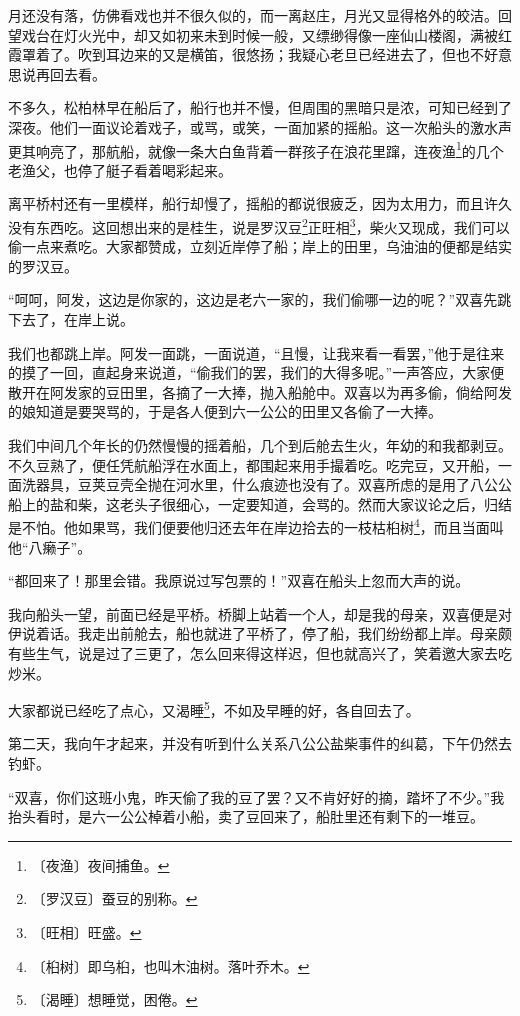 \documentclass[12pt,UTF-8,openany]{ctexbook}
\begin{document}
\begin{normalsize}
    月还没有落，仿佛看戏也并不很久似的，而一离赵庄，月光又显得格外的皎洁。回望戏台在灯火光中，却又如初来未到时候一般，又缥缈得像一座仙山楼阁，满被红霞罩着了。吹到耳边来的又是横笛，很悠扬；我疑心老旦已经进去了，但也不好意思说再回去看。
    
    不多久，松柏林早在船后了，船行也并不慢，但周围的黑暗只是浓，可知已经到了深夜。他们一面议论着戏子，或骂，或笑，一面加紧的摇船。这一次船头的激水声更其响亮了，那航船，就像一条大白鱼背着一群孩子在浪花里蹿，连夜渔\footnote{〔夜渔〕夜间捕鱼。}的几个老渔父，也停了艇子看着喝彩起来。
    
    离平桥村还有一里模样，船行却慢了，摇船的都说很疲乏，因为太用力，而且许久没有东西吃。这回想出来的是桂生，说是罗汉豆\footnote{〔罗汉豆〕蚕豆的别称。}正旺相\footnote{〔旺相〕旺盛。}，柴火又现成，我们可以偷一点来煮吃。大家都赞成，立刻近岸停了船；岸上的田里，乌油油的便都是结实的罗汉豆。
    
    “呵呵，阿发，这边是你家的，这边是老六一家的，我们偷哪一边的呢？”双喜先跳下去了，在岸上说。
    
    我们也都跳上岸。阿发一面跳，一面说道，“且慢，让我来看一看罢，”他于是往来的摸了一回，直起身来说道，“偷我们的罢，我们的大得多呢。”一声答应，大家便散开在阿发家的豆田里，各摘了一大捧，抛入船舱中。双喜以为再多偷，倘给阿发的娘知道是要哭骂的，于是各人便到六一公公的田里又各偷了一大捧。
    
    我们中间几个年长的仍然慢慢的摇着船，几个到后舱去生火，年幼的和我都剥豆。不久豆熟了，便任凭航船浮在水面上，都围起来用手撮着吃。吃完豆，又开船，一面洗器具，豆荚豆壳全抛在河水里，什么痕迹也没有了。双喜所虑的是用了八公公船上的盐和柴，这老头子很细心，一定要知道，会骂的。然而大家议论之后，归结是不怕。他如果骂，我们便要他归还去年在岸边拾去的一枝枯桕树\footnote{〔桕树〕即乌桕，也叫木油树。落叶乔木。}，而且当面叫他“八癞子”。
    
    “都回来了！那里会错。我原说过写包票的！”双喜在船头上忽而大声的说。
    
    我向船头一望，前面已经是平桥。桥脚上站着一个人，却是我的母亲，双喜便是对伊说着话。我走出前舱去，船也就进了平桥了，停了船，我们纷纷都上岸。母亲颇有些生气，说是过了三更了，怎么回来得这样迟，但也就高兴了，笑着邀大家去吃炒米。
    
    大家都说已经吃了点心，又渴睡\footnote{〔渴睡〕想睡觉，困倦。}，不如及早睡的好，各自回去了。
    
    第二天，我向午才起来，并没有听到什么关系八公公盐柴事件的纠葛，下午仍然去钓虾。
    
    “双喜，你们这班小鬼，昨天偷了我的豆了罢？又不肯好好的摘，踏坏了不少。”我抬头看时，是六一公公棹着小船，卖了豆回来了，船肚里还有剩下的一堆豆。
    

\end{normalsize}
\end{document}
